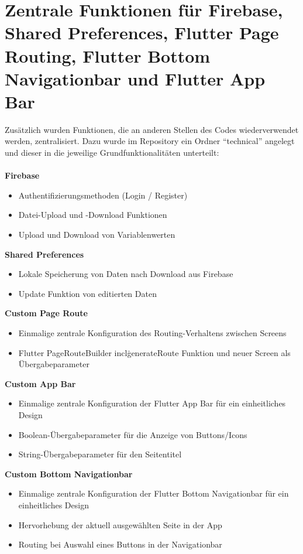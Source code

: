 \section{Zentrale Funktionen für Firebase, Shared Preferences, Flutter Page Routing, Flutter Bottom Navigationbar und Flutter App Bar}
Zusätzlich wurden Funktionen, die an anderen Stellen des Codes wiederverwendet werden, zentralisiert.
Dazu wurde im Repository ein Ordner ``technical'' angelegt und dieser in die jeweilige Grundfunktionalitäten unterteilt:
\\
\\
\textbf{Firebase}
\begin{itemize}[itemsep=0pt]
    \item{Authentifizierungsmethoden (Login / Register)} 
	\item{Datei-Upload und -Download Funktionen} 
	\item{Upload und Download von Variablenwerten} 
\end{itemize}
\textbf{Shared Preferences}
\begin{itemize}[itemsep=0pt]
    \item{Lokale Speicherung von Daten nach Download aus Firebase} 
	\item{Update Funktion von editierten Daten} 
\end{itemize}
\textbf{Custom Page Route}
\begin{itemize}[itemsep=0pt]
    \item{Einmalige zentrale Konfiguration des Routing-Verhaltens zwischen Screens} 
	\item{Flutter PageRouteBuilder incl\. generateRoute Funktion und neuer Screen als Übergabeparameter} 
\end{itemize}
\textbf{Custom App Bar}
\begin{itemize}[itemsep=0pt]
    \item{Einmalige zentrale Konfiguration der Flutter App Bar für ein einheitliches Design} 
	\item{Boolean-Übergabeparameter für die Anzeige von Buttons/Icons}
	\item{String-Übergabeparameter für den Seitentitel} 
\end{itemize}
\textbf{Custom Bottom Navigationbar}
\begin{itemize}[itemsep=0pt]
    \item{Einmalige zentrale Konfiguration der Flutter Bottom Navigationbar für ein einheitliches Design} 
	\item{Hervorhebung der aktuell ausgewählten Seite in der App}
	\item{Routing bei Auswahl eines Buttons in der Navigationbar} 
\end{itemize}

